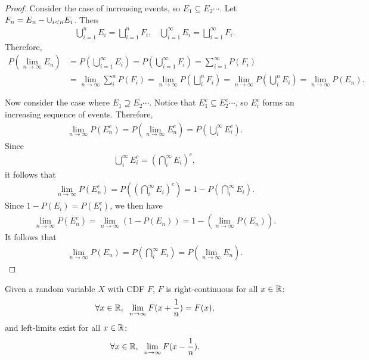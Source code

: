 \begin{proof}
    Consider the case of increasing events, so $E_1 \subseteq E_2 \cdots$. Let $F_n = E_n - \cup_{i < n}E_i$. Then
    \begin{align*}
        \bigcup_{i=1}^{n}E_i = \bigsqcup_{i=1}^{n}F_i,\;\;\;\bigcup_{i=1}^{\infty}E_i = \bigsqcup_{i=1}^{\infty}F_i.
    \end{align*}
    Therefore,
    \begin{align*}
        P\left(\lim_{n \to \infty} E_n\right) &= P\left(\bigcup_{i=1}^{\infty}E_i\right) = P\left(\bigcup_{i=1}^{\infty}F_i\right) = \sum_{i =1}^{\infty}P(F_i) \\
        &= \lim_{n \to \infty}\sum_{i}^{n}P(F_i) = \lim_{n \to \infty} P\left(\bigsqcup_{i}^{n}F_i\right) = \lim_{n \to \infty} P\left(\bigcup_{i}^{n}E_i\right) = \lim_{n \to \infty}P(E_n).
    \end{align*}

    Now consider the case where $E_1 \supseteq E_2 \cdots$. Notice that $E_1^{c} \subseteq E_2^{c} \cdots$, so $E_i^{c}$ forms an increasing sequence of events. Therefore,
    \begin{align*}
        \lim_{n \to \infty}P(E_n^{c}) = P\left(\lim_{n \to \infty}E_n^{c}\right) = P\left(\bigcup_{i}^{\infty}E_i^{c}\right).
    \end{align*}
    Since
    \begin{align*}
        \bigcup_{i}^{\infty}E_i^{c} = \left(\bigcap_{i}^{\infty}E_i\right)^{c},
    \end{align*}
    it follows that
    \begin{align*}
        \lim_{n \to \infty}P(E_n^{c}) = P\left(\left(\bigcap_{i}^{\infty}E_i\right)^{c}\right) = 1 - P\left(\bigcap_{i}^{\infty}E_i\right).
    \end{align*}
    Since $1 - P(E_i) = P(E_i^{c})$, we then have
    \begin{align*}
        \lim_{n \to \infty}P(E_n^{c}) = \lim_{n \to \infty}\left(1 - P(E_n)\right) = 1 - \left(\lim_{n \to \infty}P(E_n)\right).
    \end{align*}
    It follows that
    \begin{align*}
        \lim_{n \to \infty}P(E_n) = P\left(\bigcap_{i}^{\infty}E_i\right) = P\left(\lim_{n \to \infty}E_n\right).
    \end{align*}
\end{proof}

\begin{prop}
    Given a random variable $X$ with CDF $F$, $F$ is right-continuous for all $x \in \mathbb{R}$:
    \[\forall x \in \mathbb{R},\;\;\lim_{n \to\infty}F(x + \frac{1}{n}) = F(x),\]
    and left-limits exist for all $x \in \mathbb{R}$:
    \[\forall x \in \mathbb{R},\;\;\lim_{n \to \infty}F(x - \frac{1}{n}).\]
\end{prop}

